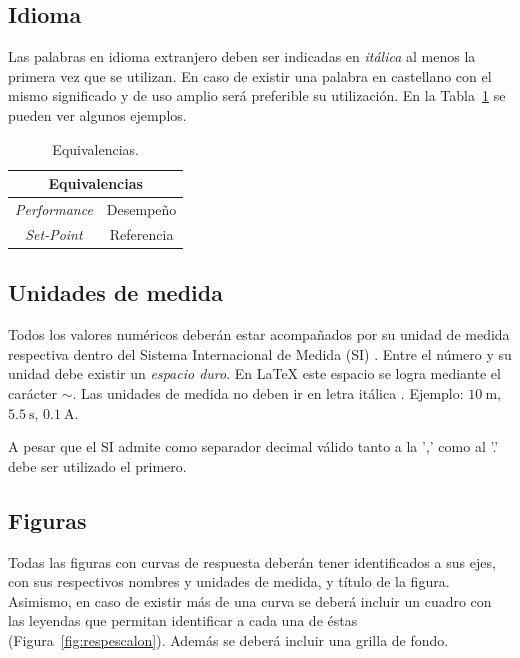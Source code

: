 \documentclass[10pt]{article}
\begin{document}
\subsection{Idioma}
Las palabras en idioma extranjero deben ser indicadas en \textit{itálica} al menos la primera vez que se utilizan. En caso de existir una palabra en castellano con el mismo significado y de uso amplio será preferible su utilización. En la Tabla~\ref{tab:equiv} se pueden ver algunos ejemplos.

\begin{table}[ht!]
\begin{center}
\begin{tabular}{cc}
\toprule
\multicolumn{2}{c}{\bf Equivalencias}\\
\midrule
\textit{Performance} & Desempeño\\
\textit{Set-Point} & Referencia\\
\bottomrule
\end{tabular}
\end{center}
\caption{Equivalencias.}
\label{tab:equiv}
\end{table}

\subsection{Unidades de medida}
Todos los valores numéricos deberán estar acompañados por su unidad de medida respectiva dentro del Sistema Internacional de Medida (SI) \cite{NIST-SI-guide}. Entre el número y su unidad debe existir un \textit{espacio duro}. En \LaTeX{} este espacio se logra mediante el carácter $\sim$. Las unidades de medida no deben ir en letra itálica \cite{NIST-SI-guide}. Ejemplo: $10~\textrm{m}$, $5.5~\textrm{s}$, $0.1~\textrm{A}$.

A pesar que el SI admite como separador decimal válido tanto a la ',' como al '.' debe ser utilizado el primero. %

\subsection{Figuras}
Todas las figuras con curvas de respuesta deberán tener identificados a sus ejes, con sus respectivos nombres y unidades de medida, y título de la figura. Asimismo, en caso de existir más de una curva se deberá incluir un cuadro con las leyendas que permitan identificar a cada una de éstas (Figura~\ref{fig:respescalon}). Además se deberá incluir una grilla de fondo.
\end{document}
